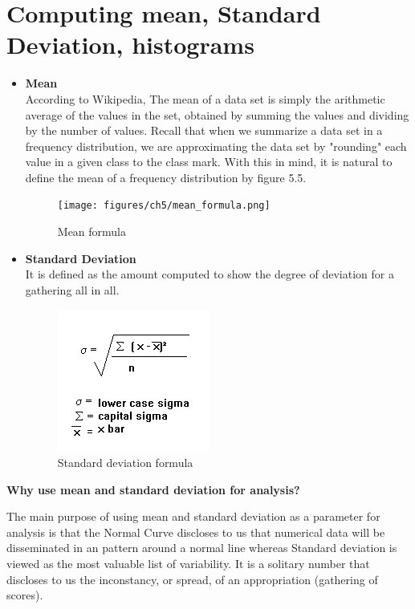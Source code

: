 \newpage

\section{Computing mean, Standard Deviation, histograms}

\begin{itemize}
    \item \textbf{Mean} \\
    According to Wikipedia, The mean of a data set is simply the arithmetic average of the values in the set, obtained by summing the values and dividing by the number of values. Recall that when we summarize a data set in a frequency distribution, we are approximating the data set by "rounding" each value in a given class to the class mark. With this in mind, it is natural to define the mean of a frequency distribution by figure 5.5.
    
     \begin{figure}[H]
            \centering
            \texttt{[image: figures/ch5/mean\_formula.png]}
            \caption{\label{fig:info_button} Mean formula}
    \end{figure}
    
    \item \textbf{Standard Deviation} \\
   It is defined as the amount computed to show the degree of deviation for a gathering all in all.
    
     \begin{figure}[H]
            \centering
            \includegraphics[width=0.25\linewidth]{figures/ch5/standard_deviation.png}
            \caption{\label{fig:info_button} Standard deviation formula}
    \end{figure}
    
\end{itemize}

\centerline{\textbf{Why use mean and standard deviation for analysis?}}

The main purpose of using mean and standard deviation as a parameter for analysis is that the Normal Curve discloses to us that numerical data will be disseminated in an pattern around a normal line whereas Standard deviation is viewed as the most valuable list of variability. It is a solitary number that discloses to us the inconstancy, or spread, of an appropriation (gathering of scores).


